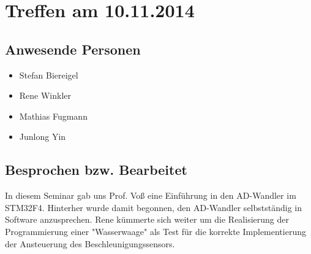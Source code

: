 \chapter{Treffen am 10.11.2014}
\section{Anwesende Personen}
\begin{itemize}
	\item Stefan Biereigel
	\item Rene Winkler
	\item Mathias Fugmann
	\item Junlong Yin
\end{itemize}

\section{Besprochen bzw. Bearbeitet}
In diesem Seminar gab uns Prof. Voß eine Einführung in den AD-Wandler im STM32F4. Hinterher wurde damit begonnen, den AD-Wandler selbstständig in Software anzusprechen. Rene kümmerte sich weiter um die Realisierung der Programmierung einer "Wasserwaage" als Test für die korrekte Implementierung der Ansteuerung des Beschleunigungssensors.